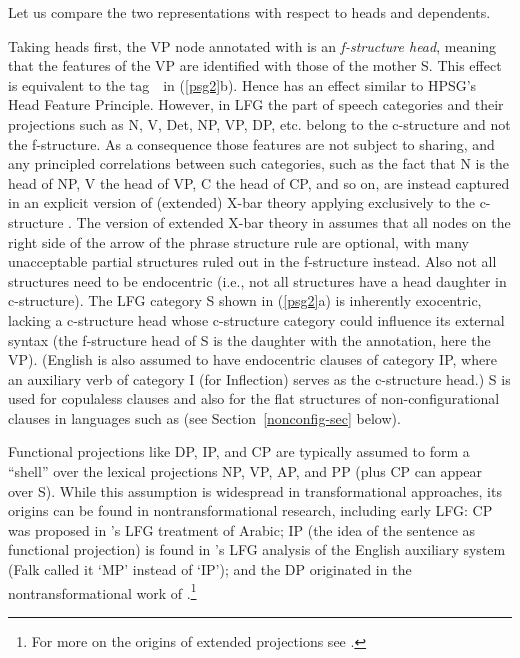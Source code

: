 \noindent
Let us compare the two representations with respect to heads and dependents.

Taking heads first, the VP node annotated with \updown{} is an \textit{f-structure head}, meaning that the features of the VP are identified with those of the mother S.  This effect is equivalent to the tag\ \ in (\ref{psg2}b).    Hence  \updown{} has an effect similar to HPSG's Head Feature Principle.  However, in LFG the part of speech categories and their projections such as N, V, Det, NP, VP, DP, etc. belong to the c-structure and not the f-structure.  As a consequence those features are not subject to sharing, and any principled correlations between such categories, such as the fact that N is the head of NP, V the head of VP, C the head of CP, and so on, are instead captured in an explicit version of (extended) X-bar theory applying exclusively to the c-structure \citep{grimshaw98}.  The version of extended X-bar theory in \citet[Chapter 6]{BATW2016a} assumes that all nodes on the right side of the arrow of the phrase structure rule are optional, with many unacceptable partial structures ruled out in the f-structure instead.  Also not all structures need to be endocentric (i.e., not all structures have a head daughter in c-structure).  The LFG category S shown in (\ref{psg2}a) is inherently exocentric, lacking a  c-structure head whose c-structure category could influence its external syntax (the f-structure head of S is the daughter with the \updown{} annotation, here the VP).   (English is also assumed to have endocentric clauses of category IP, where an auxiliary verb of category I (for Inflection) serves as the c-structure head.)  S is used for copulaless clauses and also for the flat structures of non-configurational clauses in languages such as  (see Section~\ref{nonconfig-sec} below).   

Functional projections like DP, IP, and CP are typically assumed to form a ``shell'' over the lexical projections NP, VP, AP, and PP (plus CP can appear over S).  While this assumption is widespread in transformational approaches, its origins can be found in nontransformational  research, including early LFG:  CP was proposed in \citeauthor{fassifehri81}'s \citeyearpar[141ff.]{fassifehri81}  LFG treatment of Arabic; IP (the idea of the sentence as functional projection) is found in \citeauthor{Falk83a-u}'s \citeyearpar{Falk83a-u}  LFG analysis of the English auxiliary system (Falk called it `MP' instead of `IP'); and the DP originated in the nontransformational work of \citet{Brame82a-u}.\footnote{For more on the origins of extended projections see \citet[124--5]{BATW2016a}.}  

